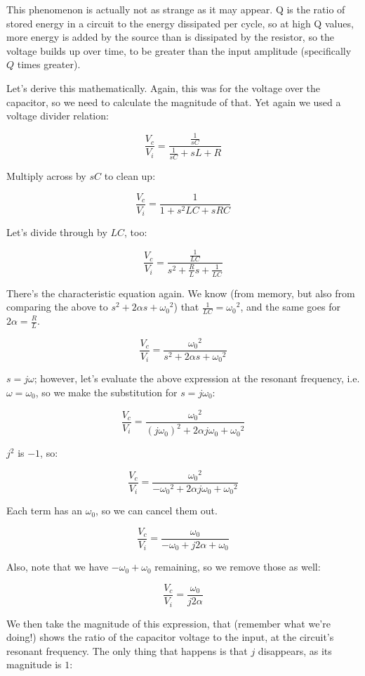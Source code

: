 \documentclass[12pt,a4paper]{report}
\begin{document}
This phenomenon is actually not as strange as it may appear. Q is the ratio of stored energy in a circuit to the energy dissipated per cycle, so at high Q values, more energy is added by the source than is dissipated by the resistor, so the voltage builds up over time, to be greater than the input amplitude (specifically $Q$ times greater).

Let's derive this mathematically. Again, this was for the voltage over the capacitor, so we need to calculate the magnitude of that. Yet again we used a voltage divider relation:

\[ \frac{V_c}{V_i} = \frac{\frac{1}{sC}}{\frac{1}{sC} + sL + R} \]

Multiply across by $sC$ to clean up:

\[ \frac{V_c}{V_i} = \frac{1}{1 + s^2LC + sRC} \]

Let's divide through by $LC$, too:

\[ \frac{V_c}{V_i} = \frac{\frac{1}{LC}}{s^2 + \frac{R}{L} s + \frac{1}{LC}} \]

There's the characteristic equation again. We know (from memory, but also from comparing the above to $s^2 + 2\alpha s + {\omega_0}^2$) that $\displaystyle \frac{1}{LC} = {\omega_0}^2$, and the same goes for $\displaystyle 2 \alpha = \frac{R}{L}$.

\[ \frac{V_c}{V_i} = \frac{{\omega_0}^2}{s^2 + 2 \alpha s + {\omega_0}^2} \]

$s = j\omega$; however, let's evaluate the above expression at the resonant frequency, i.e. $\omega = \omega_0$, so we make the substitution for $s = j\omega_0$:

\[ \frac{V_c}{V_i} = \frac{{\omega_0}^2}{(j\omega_0)^2 + 2 \alpha j\omega_0 + {\omega_0}^2} \]

$j^2$ is $-1$, so:

\[ \frac{V_c}{V_i} = \frac{{\omega_0}^2}{-{\omega_0}^2 + 2 \alpha j\omega_0 + {\omega_0}^2} \]

Each term has an $\omega_0$, so we can cancel them out. 

\[ \frac{V_c}{V_i} = \frac{{\omega_0}}{-{\omega_0} + j 2 \alpha + {\omega_0}} \]


Also, note that we have $-\omega_0 +\omega_0$ remaining, so we remove those as well:

\[ \frac{V_c}{V_i} = \frac{{\omega_0}}{j 2 \alpha} \]

We then take the magnitude of this expression, that (remember what we're doing!) shows the ratio of the capacitor voltage to the input, at the circuit's resonant frequency. The only thing that happens is that $j$ disappears, as its magnitude is $1$:
\end{document}
